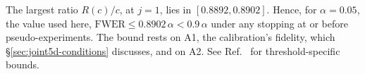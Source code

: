 The largest ratio $R(c)/c$, at $j=1$, lies in $[0.8892,0.8902]$. Hence, for $\alpha=0.05$, the value used here, $\mathrm{FWER}\le0.8902\,\alpha<0.9\,\alpha$ under any stopping at or before \jtBcap{} pseudo-experiments. The bound rests on A1, the calibration's fidelity, which \S\ref{sec:joint5d-conditions} discusses, and on A2. See Ref.~\cite{NoteRecords2026} for threshold-specific bounds.
